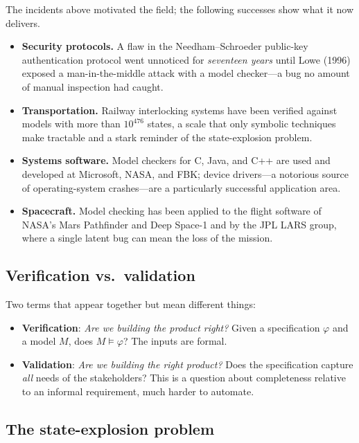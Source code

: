 The incidents above motivated the field; the following successes show what it
now delivers.
\begin{itemize}
  \item \textbf{Security protocols.}  A flaw in the Needham--Schroeder
        public-key authentication protocol went unnoticed for \emph{seventeen
        years} until Lowe (1996) exposed a man-in-the-middle attack with a
        model checker---a bug no amount of manual inspection had caught.
  \item \textbf{Transportation.}  Railway interlocking systems have been
        verified against models with more than $10^{476}$ states, a scale that
        only symbolic techniques make tractable and a stark reminder of the
        state-explosion problem.
  \item \textbf{Systems software.}  Model checkers for C, Java, and C++ are
        used and developed at Microsoft, NASA, and FBK; device
        drivers---a notorious source of operating-system crashes---are a
        particularly successful application area.
  \item \textbf{Spacecraft.}  Model checking has been applied to the flight
        software of NASA's Mars Pathfinder and Deep Space-1 and by the JPL
        LARS group, where a single latent bug can mean the loss of the
        mission.
\end{itemize}

\subsection{Verification vs.\ validation}

Two terms that appear together but mean different things:
\begin{itemize}
  \item \textbf{Verification}: \emph{Are we building the product right?}
        Given a specification $\varphi$ and a model $M$, does $M \models
        \varphi$?  The inputs are formal.
  \item \textbf{Validation}: \emph{Are we building the right product?}
        Does the specification capture \emph{all} needs of the stakeholders?
        This is a question about completeness relative to an informal
        requirement, much harder to automate.
\end{itemize}

\subsection{The state-explosion problem}
\label{sec:state-explosion}

